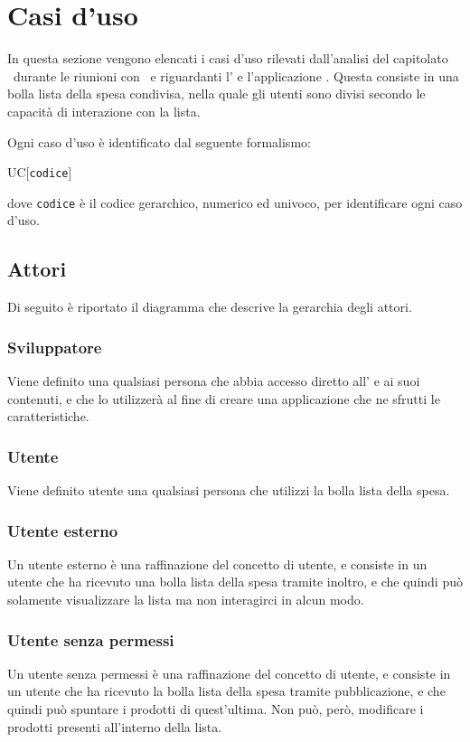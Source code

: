 \section{Casi d'uso}
In questa sezione vengono elencati i casi d'uso rilevati dall'analisi del capitolato \capitolato\ durante le riunioni con \RB\ e riguardanti l' e l'applicazione . Questa consiste in una bolla lista della spesa condivisa, nella quale gli utenti sono divisi secondo le capacità di interazione con la lista.

Ogni caso d'uso è identificato dal seguente formalismo:
\begin{center}
	UC[\texttt{codice}]
\end{center}
dove \texttt{codice} è il codice gerarchico, numerico ed univoco, per identificare ogni caso d'uso.

\subsection{Attori}
Di seguito è riportato il diagramma  che descrive la gerarchia degli attori.

\subsubsection{Sviluppatore}
Viene definito  una qualsiasi persona che abbia accesso diretto all' e ai suoi contenuti, e che lo utilizzerà al fine di creare una applicazione che ne sfrutti le caratteristiche.

\subsubsection{Utente}
Viene definito utente una qualsiasi persona che utilizzi la bolla lista della spesa.
\subsubsection{Utente esterno}
Un utente esterno è una raffinazione del concetto di utente, e consiste in un utente che ha ricevuto una bolla lista della spesa tramite inoltro, e che quindi può solamente visualizzare la lista ma non interagirci in alcun modo.
\subsubsection{Utente senza permessi}
Un utente senza permessi è una raffinazione del concetto di utente, e consiste in un utente che ha ricevuto la bolla lista della spesa tramite pubblicazione, e che quindi può spuntare i prodotti di quest'ultima. Non può, però, modificare i prodotti presenti all'interno della lista.
